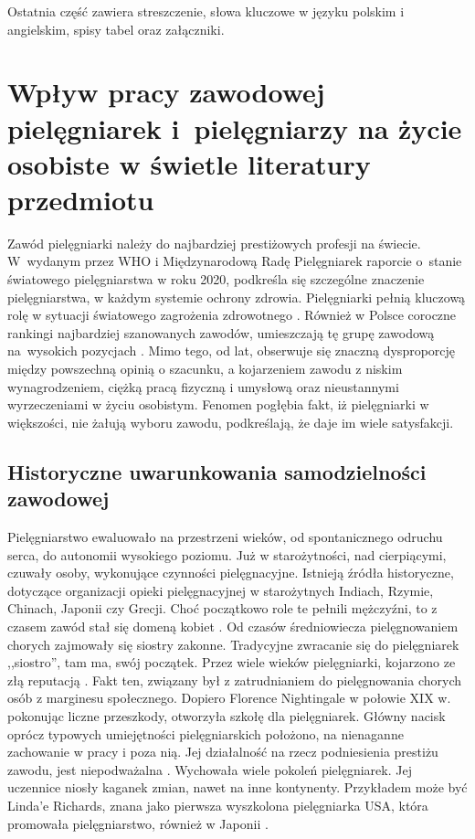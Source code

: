 \documentclass[a4paper,12pt,twoside,openright]{mwrep}
\begin{document}
Ostatnia część zawiera streszczenie, słowa kluczowe w języku polskim i angielskim, spisy tabel oraz załączniki.




\chapter{Wpływ pracy zawodowej pielęgniarek i~pielęgniarzy na życie osobiste w świetle literatury przedmiotu}
Zawód pielęgniarki należy do najbardziej prestiżowych profesji na świecie. W~wydanym przez WHO i Międzynarodową Radę Pielęgniarek raporcie o~stanie światowego pielęgniarstwa w roku 2020, podkreśla się szczególne znaczenie pielęgniarstwa, w każdym systemie ochrony zdrowia. Pielęgniarki pełnią kluczową rolę w sytuacji światowego zagrożenia zdrowotnego \cite{who}.  Również w Polsce coroczne rankingi najbardziej szanowanych zawodów, umieszczają tę grupę zawodową na~wysokich pozycjach \cite{rap}. Mimo tego, od lat, obserwuje się znaczną dysproporcję między powszechną opinią o szacunku, a kojarzeniem zawodu z niskim wynagrodzeniem, ciężką pracą fizyczną i umysłową oraz nieustannymi wyrzeczeniami w życiu osobistym. Fenomen pogłębia fakt, iż pielęgniarki w większości, nie żałują wyboru zawodu, podkreślają, że daje  im wiele satysfakcji.

\section{Historyczne uwarunkowania samodzielności zawodowej}
Pielęgniarstwo ewaluowało na przestrzeni wieków, od spontanicznego odruchu serca, do autonomii wysokiego poziomu. Już w starożytności, nad cierpiącymi, czuwały osoby, wykonujące czynności pielęgnacyjne. Istnieją źródła historyczne, dotyczące organizacji opieki pielęgnacyjnej w starożytnych Indiach, Rzymie, Chinach, Japonii czy Grecji. Choć początkowo role te pełnili mężczyźni, to z czasem zawód stał się domeną kobiet \cite{zro}. Od czasów średniowiecza pielęgnowaniem chorych zajmowały się siostry zakonne. Tradycyjne zwracanie się do pielęgniarek ,,siostro”, tam ma, swój początek. Przez wiele wieków pielęgniarki, kojarzono ze złą reputacją \cite{tlo}. Fakt ten, związany był z zatrudnianiem do pielęgnowania chorych  osób z marginesu społecznego. Dopiero Florence Nightingale w połowie XIX w. pokonując liczne przeszkody, otworzyła szkołę dla pielęgniarek. Główny nacisk oprócz typowych umiejętności pielęgniarskich położono, na nienaganne zachowanie w pracy i poza nią. Jej działalność na rzecz podniesienia prestiżu zawodu, jest niepodważalna  \cite{flo}. Wychowała wiele pokoleń pielęgniarek. Jej uczennice niosły kaganek zmian, nawet na inne kontynenty. Przykładem może być Linda'e Richards, znana jako pierwsza wyszkolona pielęgniarka USA, która promowała pielęgniarstwo, również w Japonii \cite{linda}.
\end{document}
